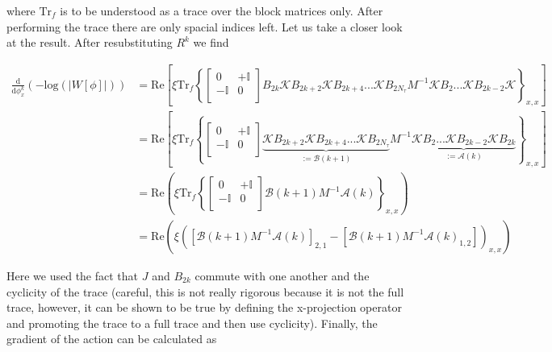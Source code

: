 \documentclass{article}
\begin{document}
where $\mathrm{Tr} _{f}$ is to be understood as a trace over the block matrices only. After performing the trace there are only spacial indices left. Let us take a closer look at the result. After resubstituting $R^{k}$ we find

\begin{align}
	\frac{\mathrm{d} }{\mathrm{d}\phi^{k}_{x} }\left(-\mathrm{log} \left(|W[\phi]|\right)   \right) &= \mathrm{Re} \left[\xi \mathrm{Tr} _{f} \left\{ \begin{bmatrix}
		0 & +\mathbb{I} \\
		-\mathbb{I} & 0 \\
	\end{bmatrix}    B_{2k} \mathcal{K} B_{2k+2}\mathcal{K} B_{2k + 4}...\mathcal{K} B_{2N_\tau}M^{-1}\mathcal{K} B_{2}...\mathcal{K} B_{2k-2}\mathcal{K}\right\}_{x,x} \right] \\
	&= \mathrm{Re} \left[\xi \mathrm{Tr} _{f} \left\{ \begin{bmatrix}
		0 & +\mathbb{I} \\
		-\mathbb{I} & 0 \\
	\end{bmatrix}   \underbrace{ \mathcal{K} B_{2k+2}\mathcal{K} B_{2k + 4}...\mathcal{K} B_{2N_\tau}}_{:=\mathcal{B}(k+1)}M^{-1}\underbrace{\mathcal{K} B_{2}...\mathcal{K} B_{2k-2}\mathcal{K}B_{2k}}_{:= \mathcal{A}(k)}  \right\}_{x,x} \right] \\
	&=  \mathrm{Re}\left(  \xi \mathrm{Tr} _{f} \left\{  \begin{bmatrix}
		0 & +\mathbb{I} \\
		-\mathbb{I} & 0 \\
	\end{bmatrix} \mathcal{B}\left(k+1\right)M^{-1} \mathcal{A}\left(k\right)    \right\}_{x,x}\right)\\
	&= \mathrm{Re}\left(  \xi  \left(\left[\mathcal{B}\left(k+1\right)M^{-1} \mathcal{A}\left(k\right)\right]_{2,1} - \left[\mathcal{B}\left(k+1\right)M^{-1} \mathcal{A}\left(k\right)_{1,2}\right]  \right)_{x,x}  \right)
\end{align} 



Here we used the fact that $J$ and $B_{2k}$ commute with one another and the cyclicity of the trace (careful, this is not really rigorous because it is not the full trace, however, it can be shown to be true by defining the x-projection operator and promoting the trace to a full trace and then use cyclicity). Finally, the gradient of the action can be calculated as
\end{document}
